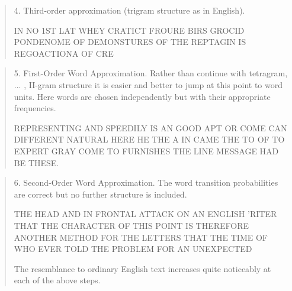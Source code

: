 \documentclass{beamer}
\begin{document}
\begin{frame}[allowframebreaks]
  \begin{center}
  \end{center}
  \begin{quote}
   
  4. Third-order approximation (trigram structure as in English).

IN NO 1ST LAT WHEY CRATICT FROURE BIRS GROCID
PONDENOME OF DEMONSTURES OF THE REPTAGIN IS
REGOACTIONA OF CRE
  \end{quote}

  \begin{quote}
5. First-Order Word Approximation. Rather than continue with tetragram,
... , II-gram structure it is easier and better to jump at this
point to word units. Here words are chosen independently but with
their appropriate frequencies.

REPRESENTING AND SPEEDILY IS AN GOOD APT OR
COME CAN DIFFERENT NATURAL HERE HE THE A IN
CAME THE TO OF TO EXPERT GRAY COME TO FURNISHES
THE LINE MESSAGE HAD BE THESE.

  \end{quote}

  \begin{quote}
    6. Second-Order Word Approximation. The word transition probabilities
are correct but no further structure is included.

THE HEAD AND IN FRONTAL ATTACK ON AN ENGLISH
'RITER THAT THE CHARACTER OF THIS POINT IS
THEREFORE ANOTHER METHOD FOR THE LETTERS
THAT THE TIME OF WHO EVER TOLD THE PROBLEM
FOR AN UNEXPECTED

The resemblance to ordinary English text increases quite noticeably at
each of the above steps.

  \end{quote}
\end{frame}

\end{document}
